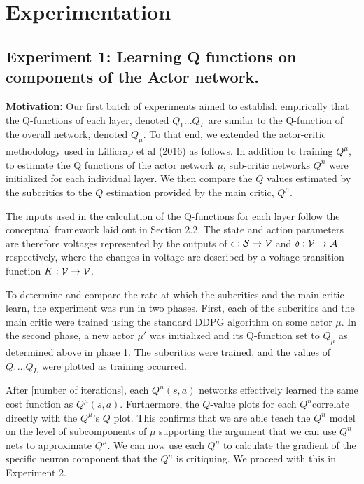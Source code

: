 \section{Experimentation}
\subsection{Experiment 1: Learning Q functions on components of the Actor network.}

\textbf{Motivation:}
Our first batch of experiments aimed to establish empirically that the Q-functions of each layer, denoted $Q_1...Q_L$ are similar to the Q-function of the overall network, denoted $Q_{\mu}$. To that end, we extended the actor-critic methodology used in Lillicrap et al (2016) as follows. In addition to training $Q^\mu$, to estimate the Q functions of the actor network $\mu$, sub-critic networks $Q^n$ were initialized for each individual layer. We then compare the $Q$ values estimated by the subcritics to the $Q$ estimation provided by the main critic, $Q^\mu$. 


The inputs used in the calculation of the Q-functions for each layer follow the conceptual framework laid out in Section 2.2. The state and action parameters are therefore voltages represented by the outputs of $\epsilon : {\mathcal S} \to {\mathcal V}$ and $\delta : {\mathcal V} \to {\mathcal A}$ respectively, where the changes in voltage are described by a voltage transition function $K : {\mathcal V} \to {\mathcal V}$. 


To determine and compare the rate at which the subcritics and the main critic learn, the experiment was run in two phases. First, each of the subcritics and the main critic were trained using the standard DDPG algorithm on some actor $\mu$. In the second phase, a new actor $\mu'$ was initialized and its Q-function set to $Q_{\mu}$ as determined above in phase 1. The subcritics were trained, and the values of $Q_1\dots Q_{L}$ were plotted as training occurred.


After [number of iterations], each $Q^n(s,a)$  networks effectively learned the same cost function as $Q^{\mu}(s,a)$. Furthermore, the $Q$-value plots for each $Q^n$correlate directly with the  $Q^{\mu}$'s $Q$ plot. This confirms that we are able teach the $Q^n$ model on the level of subcomponents of $\mu$ supporting the argument that we can use $Q^n$ nets to approximate $Q^\mu$. We can now use each $Q^n$ to calculate the gradient of the specific neuron component that the $Q^n$ is critiquing. We proceed with this in Experiment 2.

